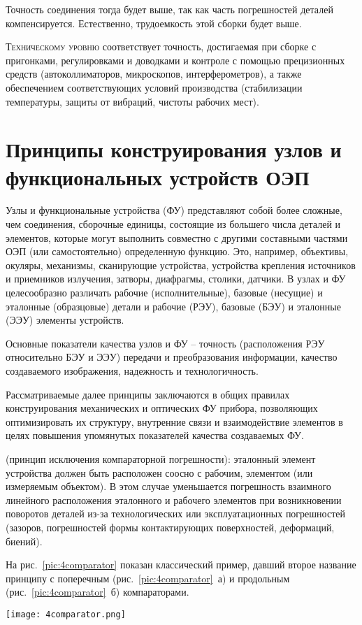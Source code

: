 Точность соединения тогда будет выше, так как часть погрешностей деталей компенсируется. Естественно, трудоемкость этой сборки будет выше.

\textsc{Техническому уровню} соответствует точность, достигаемая при сборке с пригонками, регулировками и доводками и контроле с помощью прецизионных средств (автоколлиматоров, микроскопов, интерферометров), а также обеспечением соответствующих условий производства (стабилизации температуры, защиты от вибраций, чистоты рабочих мест).

\section{Принципы конструирования узлов и функциональных устройств ОЭП}

Узлы и функциональные устройства (ФУ) представляют собой более сложные, чем соединения, сборочные единицы, состоящие из большего числа деталей и элементов, которые могут выполнить совместно с другими составными частями ОЭП (или самостоятельно) определенную функцию. Это, например, объективы, окуляры, механизмы, сканирующие устройства, устройства крепления источников и приемников излучения, затворы, диафрагмы, столики, датчики. В узлах и ФУ целесообразно различать рабочие (исполнительные), базовые (несущие) и эталонные (образцовые) детали и рабочие (РЭУ), базовые (БЭУ) и эталонные (ЭЭУ) элементы устройств.

Основные показатели качества узлов и ФУ -- точность (расположения РЭУ относительно БЭУ и ЭЭУ) передачи и преобразования информации, качество создаваемого изображения, надежность и технологичность.

Рассматриваемые далее принципы заключаются в общих правилах конструирования механических и оптических ФУ прибора, позволяющих оптимизировать их структуру, внутренние связи и взаимодействие элементов в целях повышения упомянутых показателей качества создаваемых ФУ.

 (принцип исключения компараторной погрешности): эталонный элемент устройства должен быть расположен соосно с рабочим, элементом (или измеряемым объектом). 
В этом случае уменьшается погрешность взаимного линейного расположения эталонного и рабочего элементов при возникновении поворотов деталей из-за технологических или эксплуатационных погрешностей (зазоров, погрешностей формы контактирующих поверхностей, деформаций, биений).

На рис.~\ref{pic:4comparator} показан классический пример, давший второе название принципу с поперечным (рис.~\ref{pic:4comparator}~а) и продольным (рис.~\ref{pic:4comparator}~б) компараторами.
\begin{figure*}[h!]
	\caption{Компараторы}
	\texttt{[image: 4comparator.png]}
	\label{pic:4comparator}
\end{figure*}

